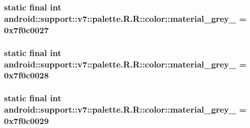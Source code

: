 \hypertarget{classandroid_1_1support_1_1v7_1_1palette_1_1_r_1_1color_368dd854c306ccec34376c057bf355d9}{
\subsubsection[{material\_\-grey\_\-600}]{\setlength{\rightskip}{0pt plus 5cm}static final int android::support::v7::palette.R.R::color::material\_\-grey\_ = 0x7f0c0027}}
\label{classandroid_1_1support_1_1v7_1_1palette_1_1_r_1_1color_368dd854c306ccec34376c057bf355d9}


\hypertarget{classandroid_1_1support_1_1v7_1_1palette_1_1_r_1_1color_08f6b77594f10534251020ecabe79157}{
\subsubsection[{material\_\-grey\_\-800}]{\setlength{\rightskip}{0pt plus 5cm}static final int android::support::v7::palette.R.R::color::material\_\-grey\_ = 0x7f0c0028}}
\label{classandroid_1_1support_1_1v7_1_1palette_1_1_r_1_1color_08f6b77594f10534251020ecabe79157}


\hypertarget{classandroid_1_1support_1_1v7_1_1palette_1_1_r_1_1color_b15252e993677a83abb4dd8af2c52ca3}{
\subsubsection[{material\_\-grey\_\-850}]{\setlength{\rightskip}{0pt plus 5cm}static final int android::support::v7::palette.R.R::color::material\_\-grey\_ = 0x7f0c0029}}
\label{classandroid_1_1support_1_1v7_1_1palette_1_1_r_1_1color_b15252e993677a83abb4dd8af2c52ca3}


